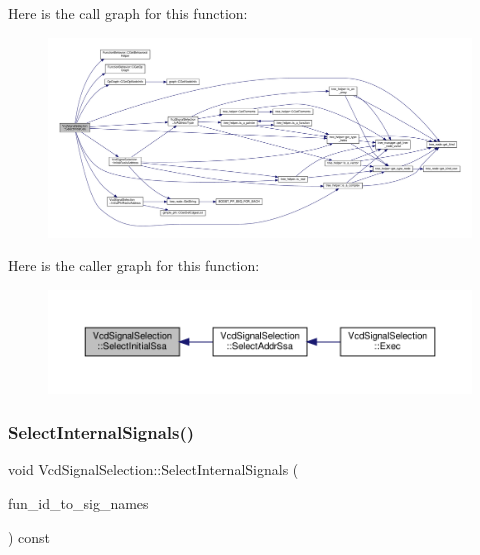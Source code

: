 Here is the call graph for this function\+:
\nopagebreak
\begin{figure}[H]
\begin{center}
\leavevmode
\includegraphics[width=350pt]{dd/de4/classVcdSignalSelection_a6cd238a016c6e74ad346437c5a8ff783_cgraph}
\end{center}
\end{figure}
Here is the caller graph for this function\+:
\nopagebreak
\begin{figure}[H]
\begin{center}
\leavevmode
\includegraphics[width=350pt]{dd/de4/classVcdSignalSelection_a6cd238a016c6e74ad346437c5a8ff783_icgraph}
\end{center}
\end{figure}
\mbox{\label{classVcdSignalSelection_a54478a4fe3af6bfed3b3a12e284b4d9e}} 
\subsubsection{\texorpdfstring{Select\+Internal\+Signals()}{SelectInternalSignals()}}
{\footnotesize\ttfamily void Vcd\+Signal\+Selection\+::\+Select\+Internal\+Signals (\begin{DoxyParamCaption}\item[{\hyperlink{custom__map_8hpp_ad1ed68f2ff093683ab1a33522b144adc}{Custom\+Unordered\+Map}$<$ unsigned int, \hyperlink{custom__set_8hpp_a1f63d303cef2790dc0a0ff7feae38f83}{Unordered\+Set\+Std\+Stable}$<$ std\+::string $>$$>$ \&}]{fun\+\_\+id\+\_\+to\+\_\+sig\+\_\+names }\end{DoxyParamCaption}) const\hspace{0.3cm}{\ttfamily [protected]}}



